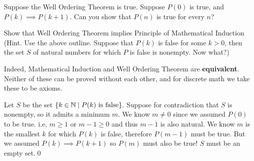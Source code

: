Suppose the Well Ordering Theorem is true. Suppose $P(0)$ is true, and $P(k) \implies P(k + 1)$. Can you show that $P(n)$ is true for every $n$?
\begin{SNP}{\ex}{
Show that Well Ordering Theorem implies Principle of Mathematical Induction (Hint. Use the above outline. Suppose that $P(k)$ is false for some $k > 0$, then the set $S$ of natural numbers for which $P$ is false is nonempty. Now what?)}
\end{SNP}

Indeed, Mathematical Induction and Well Ordering Theorem are \textbf{equivalent}. Neither of these can be proved without each other, and for discrete math we take these to be axioms.

\AnswerSection
\ans Let $S$ be the set $\{ k \in \mathbb{N} \space \mid \space P(k) \text{ is false} \}$. Suppose for contradiction that $S$ is nonempty, so it admits a minimum $m$. We know $m \neq 0$ since we assumed $P(0)$ to be true. i.e, $m \geq 1$ or $m - 1 \geq 0$ and thus $m - 1$ is also natural. We know $m$ is the smallest $k$ for which $P(k)$ is false, therefore $P(m - 1)$ must be true. But we assumed $P(k) \implies P(k + 1)$ so $P(m)$ must also be true! $S$ must be an empty set.\qed
